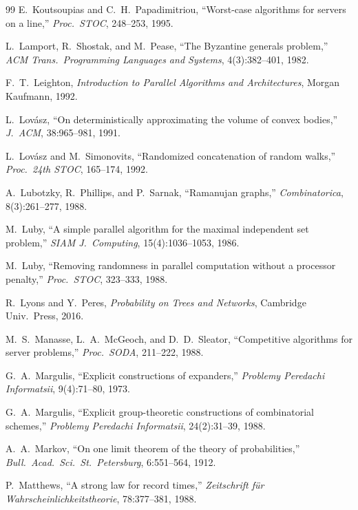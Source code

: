 \documentclass[twoside,12pt]{book}
\theoremstyle{plain}
\theoremstyle{definition}
\theoremstyle{remark}
\begin{document}
\begin{thebibliography}{99}
E.~Koutsoupias and C.~H.~Papadimitriou,
``Worst-case algorithms for servers on a line,''
\textit{Proc.~STOC}, 248--253, 1995.

L.~Lamport, R.~Shostak, and M.~Pease,
``The Byzantine generals problem,''
\textit{ACM Trans.~Programming Languages and Systems}, 4(3):382--401, 1982.

F.~T.~Leighton,
\textit{Introduction to Parallel Algorithms and Architectures},
Morgan Kaufmann, 1992.

L.~Lov\'{a}sz,
``On deterministically approximating the volume of convex bodies,''
\textit{J.~ACM}, 38:965--981, 1991.

L.~Lov\'{a}sz and M.~Simonovits,
``Randomized concatenation of random walks,''
\textit{Proc.~24th STOC}, 165--174, 1992.

A.~Lubotzky, R.~Phillips, and P.~Sarnak,
``Ramanujan graphs,''
\textit{Combinatorica}, 8(3):261--277, 1988.

M.~Luby,
``A simple parallel algorithm for the maximal independent set problem,''
\textit{SIAM J.~Computing}, 15(4):1036--1053, 1986.

M.~Luby,
``Removing randomness in parallel computation without a processor penalty,''
\textit{Proc.~STOC}, 323--333, 1988.

R.~Lyons and Y.~Peres,
\textit{Probability on Trees and Networks},
Cambridge Univ.~Press, 2016.

M.~S.~Manasse, L.~A.~McGeoch, and D.~D.~Sleator,
``Competitive algorithms for server problems,''
\textit{Proc.~SODA}, 211--222, 1988.

G.~A.~Margulis,
``Explicit constructions of expanders,''
\textit{Problemy Peredachi Informatsii}, 9(4):71--80, 1973.

G.~A.~Margulis,
``Explicit group-theoretic constructions of combinatorial schemes,''
\textit{Problemy Peredachi Informatsii}, 24(2):31--39, 1988.

A.~A.~Markov,
``On one limit theorem of the theory of probabilities,''
\textit{Bull.~Acad.~Sci.~St.~Petersburg}, 6:551--564, 1912.

P.~Matthews,
``A strong law for record times,''
\textit{Zeitschrift f\"ur Wahrscheinlichkeitstheorie}, 78:377--381, 1988.


\end{thebibliography}
\end{document}

